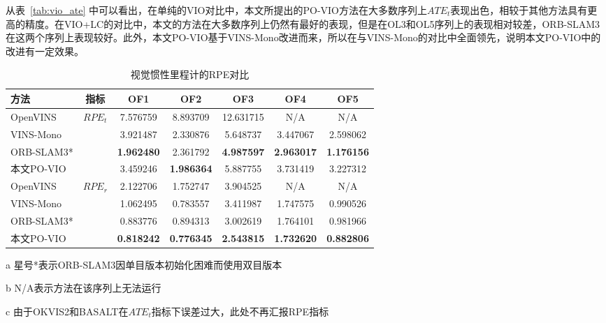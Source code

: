 从表~\ref{tab:vio_ate} 中可以看出，在单纯的VIO对比中，本文所提出的PO-VIO方法在大多数序列上$ATE_t$表现出色，相较于其他方法具有更高的精度。在VIO+LC的对比中，本文的方法在大多数序列上仍然有最好的表现，但是在OL3和OL5序列上的表现相对较差，ORB-SLAM3在这两个序列上表现较好。此外，本文PO-VIO基于VINS-Mono改进而来，所以在与VINS-Mono的对比中全面领先，说明本文PO-VIO中的改进有一定效果。

\begin{table}
\centering
\begin{threeparttable}
\caption{视觉惯性里程计的RPE\textdownarrow{}对比}
\begin{tabular}{lcccccc}
\toprule
方法        & 指标                    & OF1               & OF2               & OF3               & OF4               & OF5               \\ \midrule
OpenVINS  & \multirow{4}{*}{$RPE_t$} & 7.576759          & 8.893709          & 12.631715         & N/A               & N/A               \\
VINS-Mono &                       & 3.921487          & 2.330876          & 5.648737          & 3.447067          & 2.598062          \\
ORB-SLAM3* &                       & \cellcolor[HTML]{FFCCC9}\textbf{1.962480} & 2.361792          & \cellcolor[HTML]{FFCCC9}\textbf{4.987597} & \cellcolor[HTML]{FFCCC9}\textbf{2.963017} & \cellcolor[HTML]{FFCCC9}\textbf{1.176156} \\
本文PO-VIO      &                       & 3.459246          & \cellcolor[HTML]{FFCCC9}\textbf{1.986364} & 5.887755          & 3.731419          & 3.227312          \\ \midrule
OpenVINS  & \multirow{4}{*}{$RPE_r$} & 2.122706          & 1.752747          & 3.904525          & N/A               & N/A               \\
VINS-Mono &                       & 1.062495          & 0.783557          & 3.411987          & 1.747575          & 0.990526          \\
ORB-SLAM3* &                       & 0.883776          & 0.894313          & 3.002619          & 1.764101          & 0.981966          \\
本文PO-VIO       &                       & \cellcolor[HTML]{FFCCC9}\textbf{0.818242} & \cellcolor[HTML]{FFCCC9}\textbf{0.776345} & \cellcolor[HTML]{FFCCC9}\textbf{2.543815} & \cellcolor[HTML]{FFCCC9}\textbf{1.732620} & \cellcolor[HTML]{FFCCC9}\textbf{0.882806} \\ \bottomrule
\end{tabular}
\label{tab:vio_rpe}
\begin{tablenotes}
  \item [a] 星号*表示ORB-SLAM3因单目版本初始化困难而使用双目版本
  \item [b] N/A表示方法在该序列上无法运行
  \item [c] 由于OKVIS2和BASALT在$ATE_t$指标下误差过大，此处不再汇报RPE指标
\end{tablenotes}
\end{threeparttable}
\end{table}

